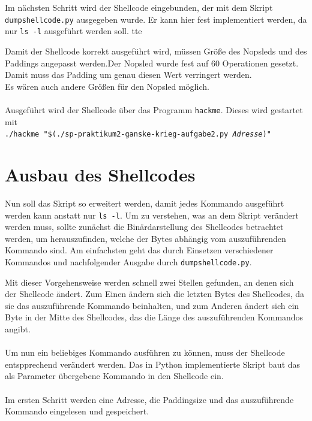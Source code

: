 \documentclass[12pt]{article}
\begin{document}
{{			
			Im n\"achsten Schritt wird der Shellcode eingebunden, der mit dem Skript \texttt{dumpshellcode.py} ausgegeben wurde. Er kann hier fest implementiert werden, da nur \texttt{ls -l} ausgef\"uhrt werden soll.
			tte
			
			Damit der Shellcode korrekt ausgef\"uhrt wird, m\"ussen Gr\"o{\ss}e des Nopsleds und des Paddings angepasst werden.Der Nopsled wurde fest auf 60 Operationen gesetzt. Damit muss das Padding um genau diesen Wert verringert werden.\\ Es w\"aren auch andere Gr\"o{\ss}en f\"ur den Nopsled m\"oglich.\\
			~\\
			Ausgef\"uhrt wird der Shellcode \"uber das Programm \texttt{hackme}. Dieses wird gestartet mit\\
			\texttt{./hackme "\$(./sp-praktikum2-ganske-krieg-aufgabe2.py \textit{Adresse})"}
			
	\section{Ausbau des Shellcodes}
	
	Nun soll das Skript so erweitert werden, damit jedes Kommando ausgef\"uhrt werden kann anstatt nur \texttt{ls -l}.
			Um zu verstehen, was an dem Skript ver\"andert werden muss, sollte zun\"achst die Bin\"ardarstellung des Shellcodes betrachtet werden, um herauszufinden, welche der Bytes abh\"angig vom auszuf\"uhrenden Kommando sind. Am einfachsten geht das durch Einsetzen verschiedener Kommandos und nachfolgender Ausgabe durch \texttt{dumpshellcode.py}.
			
			
			Mit dieser Vorgehensweise werden schnell zwei Stellen gefunden, an denen sich der Shellcode \"andert. Zum Einen \"andern sich die letzten Bytes des Shellcodes, da sie das auszuf\"uhrende Kommando beinhalten, und zum Anderen \"andert sich ein Byte in der Mitte des Shellcodes, das die L\"ange des auszuf\"uhrenden Kommandos angibt.\\
			~\\
			Um nun ein beliebiges Kommando ausf\"uhren zu k\"onnen, muss der Shellcode entspprechend ver\"andert werden. Das in Python implementierte Skript baut das als Parameter \"ubergebene Kommando in den Shellcode ein.\\
			~\\
			
			Im ersten Schritt werden eine Adresse, die Paddingsize und das auszuf\"uhrende Kommando eingelesen und gespeichert. 
			
}}
\end{document}
